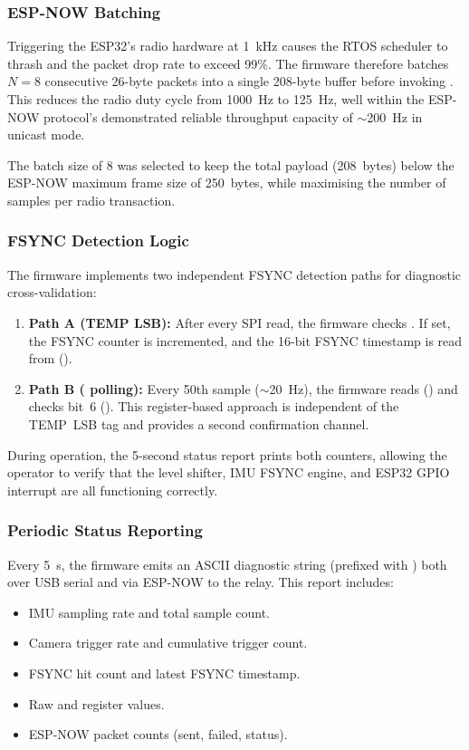 \subsubsection{ESP-NOW Batching}

Triggering the ESP32's radio hardware at \SI{1}{\kilo\hertz} causes the RTOS scheduler to thrash and the packet drop rate to exceed 99\%.
The firmware therefore batches $N = 8$ consecutive 26-byte packets into a single 208-byte buffer before invoking .
This reduces the radio duty cycle from \SI{1000}{\hertz} to \SI{125}{\hertz}, well within the ESP-NOW protocol's demonstrated reliable throughput capacity of $\sim$\SI{200}{\hertz} in unicast mode.

The batch size of 8 was selected to keep the total payload (208~bytes) below the ESP-NOW maximum frame size of 250~bytes, while maximising the number of samples per radio transaction.

\subsubsection{FSYNC Detection Logic}

The firmware implements two independent FSYNC detection paths for diagnostic cross-validation:
\begin{enumerate}[nosep]
  \item \textbf{Path A (TEMP LSB):} After every SPI read, the firmware checks . If set, the FSYNC counter  is incremented, and the 16-bit FSYNC timestamp is read from  ().
  \item \textbf{Path B ( polling):} Every 50th sample ($\sim$\SI{20}{\hertz}), the firmware reads  () and checks bit~6 (). This register-based approach is independent of the TEMP~LSB tag and provides a second confirmation channel.
\end{enumerate}

During operation, the 5-second status report prints both counters, allowing the operator to verify that the level shifter, IMU FSYNC engine, and ESP32 GPIO interrupt are all functioning correctly.

\subsubsection{Periodic Status Reporting}

Every \SI{5}{\second}, the firmware emits an ASCII diagnostic string (prefixed with \code{\#}) both over USB serial and via ESP-NOW to the relay.
This report includes:
\begin{itemize}[nosep]
  \item IMU sampling rate and total sample count.
  \item Camera trigger rate and cumulative trigger count.
  \item FSYNC hit count and latest FSYNC timestamp.
  \item Raw  and  register values.
  \item ESP-NOW packet counts (sent, failed, status).
\end{itemize}


